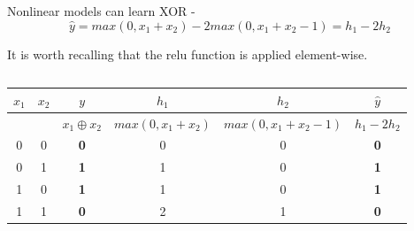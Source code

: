 \begin{frame}[t,allowframebreaks]{Nonlinear models can learn XOR -}
    \begin{equation}
        \hat{y} = 
        max(0,x_1+x_2) - 2 max(0,x_1+x_2-1) =
        h_1 - 2 h_2
        \label{eq:learn_xor_nonlinear_model_final_w_weights}
    \end{equation}        

    It is worth recalling that the \gls{relu} function is applied element-wise.\\
    \vspace{0.2cm}

    \begin{columns}[t]
        \begin{column}{0.70\textwidth}
            \vspace{-1.1cm}
            \begin{center}
                \begin{tabular}{ c c | c || c  c | c }
                 $x_1$ & 
                 $x_2$ & 
                 {\bf \color{cadmiumred}$y$} & 
                 $h_1$     & 
                 $h_2$ & 
                 {\bf \color{cadmiumgreen}$\hat{y}$} \\ 
                 \hline
                  & 
                  & 
                 {\bf \color{cadmiumred}$x_1 \oplus x_2$} & 
                 $max(0,x_1+x_2)$     & 
                 $max(0,x_1+x_2-1)$ & 
                 {\bf \color{cadmiumgreen}$h_1-2h_2$} \\ 
                 \hline
                 0 & 0 & {\bf \color{cadmiumred}0} & 0 & 0 & {\bf \color{cadmiumgreen}0} \\  
                 0 & 1 & {\bf \color{cadmiumred}1} & 1 & 0 & {\bf \color{cadmiumgreen}1} \\   
                 1 & 0 & {\bf \color{cadmiumred}1} & 1 & 0 & {\bf \color{cadmiumgreen}1} \\  
                 1 & 1 & {\bf \color{cadmiumred}0} & 2 & 1 & {\bf \color{cadmiumgreen}0} \\   
                \end{tabular}
            \end{center}
        \end{column}
        \begin{column}{0.30\textwidth}
        \end{column}
    \end{columns}

\end{frame}

